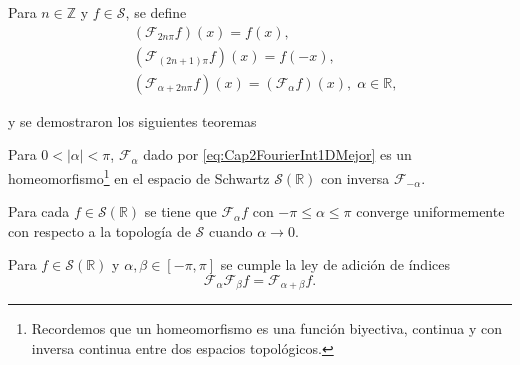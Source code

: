         \begin{definition*}
            Para $n\in \mathbb{Z}$ y $f \in \mathcal{S}$, se define
            \begin{align}
                & \left(\mathcal{F}_{2n\pi} f\right)(x) = f(x),\\
                & \left(\mathcal{F}_{(2n+1)\pi} f\right)(x) = f(-x),\\
                & \left(\mathcal{F}_{\alpha + 2n\pi}f  \right)(x) = \left(\mathcal{F}_{\alpha}f\right)(x), \; \alpha \in \mathbb{R},
            \end{align}         
        \end{definition*} 
        y se demostraron los siguientes teoremas \citep{mcbride1987namias}

        \begin{theorem*}
            Para $0 < |\alpha| < \pi$, $\mathcal{F}_\alpha$ dado por \ref{eq:Cap2FourierInt1DMejor} es un homeomorfismo\footnote{Recordemos que un homeomorfismo es una función biyectiva, continua y con inversa continua entre dos espacios topológicos.} en el espacio de Schwartz $\mathcal{S}\left(\mathbb{R}\right)$ con inversa $\mathcal{F}_{-\alpha}$.
        \end{theorem*}

        \begin{theorem*}
            Para cada $f \in \mathcal{S}\left(\mathbb{R}\right)$ se tiene que $\mathcal{F}_\alpha f$ con $ -\pi \leq \alpha \leq \pi$ converge uniformemente con respecto a la topología de $\mathcal{S}$ cuando $\alpha \to 0$.
        \end{theorem*}

        \begin{theorem*}
            Para $f\in \mathcal{S}\left(\mathbb{R}\right)$ y $\alpha,\beta \in \left[-\pi, \pi\right]$ se cumple la ley de adición de índices
            \begin{equation*}
                \mathcal{F}_\alpha \mathcal{F}_\beta f = \mathcal{F}_{\alpha+\beta}f.
            \end{equation*}
        \end{theorem*}

